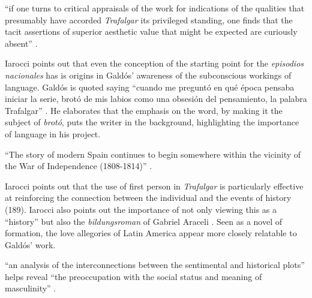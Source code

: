 \documentclass[12pt]{article}
\title{}
\makeatletter
\newcommand\iraggedright{%
	\let\\\@centercr\@rightskip\@flushglue \rightskip\@rightskip
	\leftskip\z@skip}
\makeatother
\begin{document}
	\makeheader
	\iraggedright
	
\enquote{if one turns to critical appraisals of the work for indications of the qualities that presumably have accorded \textit{Trafalgar} its privileged standing, one finds that the tacit assertions of superior aesthetic value that might be expected are curiously absent} \cite[183]{Iarocci2003}.

Iarocci points out that even the conception of the starting point for the \textit{episodios nacionales} has is origins in Galdós' awareness of the subconscious workings of language.
Galdós is quoted saying \enquote{cuando me preguntó en qué época pensaba iniciar la serie, brotó de mis labios como una obsesión del pensamiento, la palabra Trafalgar} \cite[184]{Iarocci2003}.
He elaborates that the emphasis on the word, by making it the subject of \textit{brotó}, puts the writer in the background, highlighting the importance of language in his project.

\enquote{The story of modern Spain continues to begin somewhere within the vicinity of the War of Independence (1808-1814)} \cite[185]{Iarocci2003}.

Iarocci points out that the use of first person in \textit{Trafalgar} is particularly effective at reinforcing the connection between the individual and the events of history (189).
Iarocci also points out the importance of not only viewing this as a \enquote{history} but also the \textit{bildungsroman} of Gabriel Araceli \cite[189]{Iarocci2003}.
Seen as a novel of formation, the love allegories of Latin America appear more closely relatable to Galdós' work.

\enquote{an analysis of the interconnections between the sentimental and historical plots} helps reveal \enquote{the preoccupation with the social status and meaning of masculinity} \cite[190]{Iarocci2003}.


\makeworkscited
\listoftodos
\end{document}
